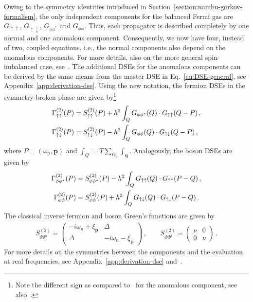 %
Owing to the symmetry identities introduced in Section~\ref{section:nambu-gorkov-formalism}, the only independent components for the balanced Fermi gas are $G_{\uparrow\uparrow}$, $G_{\uparrow\downarrow}$, $G_{\phi\phi^*}$ and $G_{\phi\phi}$. Thus, each propagator is described completely by one normal and one anomalous component. Consequently, we now have four, instead of two, coupled equations, i.e., the normal components also depend on the anomalous components. For more details, also on the more general spin-imbalanced case, see~\cite{Frank2018}. The additional DSEs for the anomalous components can be derived by the same means from the master DSE in Eq.~\eqref{eq:DSE-general}, see Appendix~\ref{app:derivation-dse}. Using the new notation, the fermion DSEs in the symmetry-broken phase are given by\footnote{Note the different sign as compared to~\cite{Haussmann2009} for the anomalous component, see also~\cite{Andrenacci2003,Frank2018,Pieri2004-1}.}
%
\begin{align}
	\label{eq:fermion-DSEs-general}
	\Gamma^{(2)}_{\uparrow\uparrow}(P) &= S^{(2)}_{\uparrow\uparrow}(P) + h^2 \int_Q G_{\phi\phi^*}(Q) \cdot G_{\uparrow\uparrow}(Q-P)  \,, \notag \\
	\Gamma^{(2)}_{\uparrow\downarrow}(P) &= S^{(2)}_{\uparrow\downarrow}(P) - h^2 \int_Q G_{\phi\phi}(Q) \cdot G_{\uparrow\downarrow}(Q-P) \,,
\end{align}
%
where $P=(\omega_n,\bm{p})$ and $\int_Q=T\sum_{\Omega_n}\int_{\bm{q}}$. Analogously, the boson DSEs are given by
%
\begin{align}
	\label{eq:boson-DSEs-general}
	\Gamma^{(2)}_{\phi\phi^*}(P) &= S^{(2)}_{\phi\phi^*}(P) - h^2 \int_Q G_{\uparrow\uparrow}(Q) \cdot G_{\uparrow\uparrow}(P-Q) \,, \notag \\
	\Gamma^{(2)}_{\phi\phi}(P) &= S^{(2)}_{\phi\phi}(P) + h^2 \int_Q G_{\uparrow\downarrow}(Q) \cdot G_{\uparrow\downarrow}(P-Q) \,.
\end{align}
%
The classical inverse fermion and boson Green's functions are given by
%
\begin{align}
	\label{eq:classical-propagators-components}
	S^{(2)}_{\Psi\Psi^{\dagger}} =
	\begin{pmatrix}
		-i\omega_n+\xi_{\bm{p}} & \Delta \\
		\Delta & -i\omega_n-\xi_{\bm{p}}
	\end{pmatrix} \,, \qquad
	S^{(2)}_{\Phi\Phi^{\dagger}} =
	\begin{pmatrix}
		\nu & 0 \\
		0 & \nu
	\end{pmatrix} \,.
\end{align}
%
For more details on the symmetries between the components and the evaluation at real frequencies, see Appendix~\ref{app:derivation-dse} and~\cite{Pieri2004-1}.


